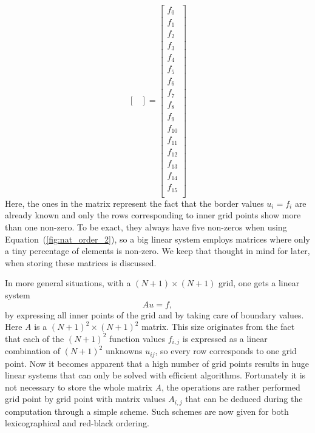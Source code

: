 \begin{equation}
\begin{bmatrix}
 \end{bmatrix} =
 \begin{bmatrix}
  f_{0}   \\
  f_{1}   \\
  f_{2}   \\
  f_{3}   \\
  f_{4}   \\
  f_{5}   \\
  f_{6}   \\
  f_{7}   \\
  f_{8}   \\
  f_{9}   \\
  f_{10}   \\
  f_{11}   \\
  f_{12}   \\
  f_{13}   \\
  f_{14}   \\
  f_{15}   \\
 \end{bmatrix}
 \label{equ:hugeA}
\end{equation}
Here, the ones in the matrix represent the fact that the border values $u_i = f_i$ are already known and only the rows corresponding to inner grid points show more than one non-zero. To be exact, they always have five non-zeros when using Equation~(\ref{fig:nat_order_2}), so a big linear system employs matrices where only a tiny percentage of elements is non-zero. We keep that thought in mind for later, when storing these matrices is discussed.


In more general situations, with a $(N+1) \times (N+1)$ grid, one gets a linear system
\begin{equation}
Au = f,
\end{equation}
by expressing all inner points of the grid and by taking care of boundary values. Here \textit{A} is a $(N+1) ^2 \times (N+1)^2$ matrix. This size originates from the fact that each of the $(N+1)^2$ function values $f_{i,j}$ is expressed as a linear combination of $(N+1)^2$ unknowns $u_{ij}$, so every row corresponds to one grid point. Now it becomes apparent that a high number of grid points results in huge linear systems that can only be solved with efficient algorithms. Fortunately it is not necessary to store the whole matrix \textit{A}, the operations are rather performed grid point by grid point with matrix values $A_{i,j}$ that can be deduced during the computation through a simple scheme. Such schemes are now given for both lexicographical and red-black ordering.


